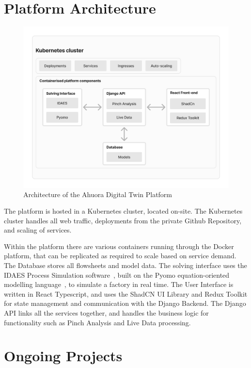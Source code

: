 \section{Platform Architecture}

\begin{figure}[h]
    \centering
    \includegraphics[width=\textwidth]{dt_arch.png}
    \caption{Architecture of the Ahuora Digital Twin Platform}
    \label{sec:platform_architecture}
\end{figure}

The platform is hosted in a Kubernetes cluster, located on-site. The Kubernetes cluster handles all web traffic, deployments from the private Github Repository, and scaling of services. 

Within the platform there are various containers running through the Docker platform, that can be replicated as required to scale based on service demand. The Database stores all flowsheets and model data. The solving interface uses the IDAES Process Simulation software~\cite{lee2021idaes}, built on the Pyomo equation-oriented modelling language~\cite{bynum2021pyomo}, to simulate a factory in real time. The User Interface is written in React Typescript, and uses the ShadCN UI Library and Redux Toolkit for state management and communication with the Django Backend. The Django API links all the services together, and handles the business logic for functionality such as Pinch Analysis and Live Data processing.

\section{Ongoing Projects}

